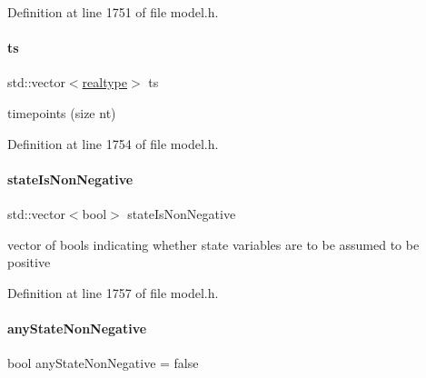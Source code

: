 Definition at line 1751 of file model.\+h.

\mbox{\label{classamici_1_1_model_aa7014a80e7b102f85a10e3b9a480e8e5}} 
\paragraph{\texorpdfstring{ts}{ts}}
{\footnotesize\ttfamily std\+::vector$<$\mbox{\hyperlink{namespaceamici_a1bdce28051d6a53868f7ccbf5f2c14a3}{realtype}}$>$ ts\hspace{0.3cm}{\ttfamily [protected]}}

timepoints (size nt) 

Definition at line 1754 of file model.\+h.

\mbox{\label{classamici_1_1_model_a30f9edd35aad3ccaba31f67331881da5}} 
\paragraph{\texorpdfstring{state\+Is\+Non\+Negative}{stateIsNonNegative}}
{\footnotesize\ttfamily std\+::vector$<$bool$>$ state\+Is\+Non\+Negative\hspace{0.3cm}{\ttfamily [protected]}}

vector of bools indicating whether state variables are to be assumed to be positive 

Definition at line 1757 of file model.\+h.

\mbox{\label{classamici_1_1_model_a2b314d4bdf8555d609a69846b4ab0934}} 
\paragraph{\texorpdfstring{any\+State\+Non\+Negative}{anyStateNonNegative}}
{\footnotesize\ttfamily bool any\+State\+Non\+Negative = false\hspace{0.3cm}{\ttfamily [protected]}}

